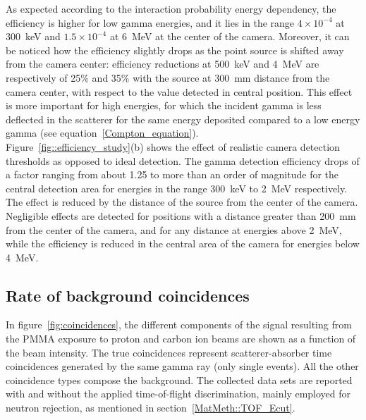 As expected according to the interaction probability energy dependency, the efficiency is higher for low gamma energies, and it lies in the range $4\times10^{-4}$ at 300~keV and $1.5\times10^{-4}$ at 6~MeV at the center of the camera. Moreover, it can be noticed how the efficiency slightly drops as the point source is shifted away from the camera center: efficiency reductions at 500~keV and 4~MeV are respectively of 25\% and 35\% with the source at 300~mm distance from the camera center, with respect to the value detected in central position. This effect is more important for high energies, for which the incident gamma is less deflected in the scatterer for the same energy deposited compared to a low energy gamma (see equation~\ref{Compton_equation}).\\  
Figure~\ref{fig::efficiency_study}(b) shows the effect of realistic camera detection thresholds as opposed to ideal detection. The gamma detection efficiency drops of a factor ranging from about 1.25 to more than an order of magnitude for the central detection area for energies in the range 300~keV to 2~MeV respectively. The effect is reduced by the distance of the source from the center of the camera. Negligible effects are detected for positions with a distance greater than 200~mm from the center of the camera, and for any distance at energies above 2~MeV, while the efficiency is reduced in the central area of the camera for energies below 4~MeV.\\
 
\subsection{Rate of background coincidences}
\label{Results::beamInt}
 
In figure~\ref{fig:coincidences}, the different components of the signal resulting from the PMMA exposure to proton and carbon ion beams are shown as a function of the beam intensity. The true coincidences represent scatterer-absorber time coincidences generated by the same gamma ray (only single events). All the other coincidence types compose the background. The collected data sets are reported with and without the applied time-of-flight discrimination, mainly employed for neutron rejection, as mentioned in section~\ref{MatMeth::TOF_Ecut}.


